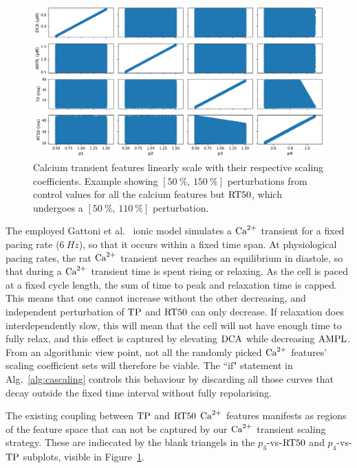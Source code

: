 \begin{figure}[!ht]
    \myfloatalign
    \includegraphics[width=\textwidth]{figures/chapter06/p_vs_b.png}
    \caption{Calcium transient features linearly scale with their respective scaling coefficients. Example showing $[\SI{50}{\percent},\,\SI{150}{\percent}]$ perturbations from control values for all the calcium features but $\textrm{RT50}$, which undergoes a $[\SI{50}{\percent},\,\SI{110}{\percent}]$ perturbation.}
    \label{fig:scalersvscafeatures}
\end{figure}

\vspace{0.2cm}
The employed Gattoni et al.~\cite{Gattoni:2017} ionic model simulates a $\textrm{Ca}^{2+}$ transient for a fixed pacing rate ($\SI{6}{Hz}$), so that it occurs within a fixed time span. At physiological pacing rates, the rat $\textrm{Ca}^{2+}$ transient never reaches an equilibrium in diastole, so that during a $\textrm{Ca}^{2+}$ transient time is spent rising or relaxing. As the cell is paced at a fixed cycle length, the sum of time to peak and relaxation time is capped. This means that one cannot increase without the other decreasing, and independent perturbation of $\textrm{TP}$ and $\textrm{RT50}$ can only decrease. If relaxation does interdependently slow, this will mean that the cell will not have enough time to fully relax, and this effect is captured by elevating $\textrm{DCA}$ while decreasing $\textrm{AMPL}$. From an algorithmic view point, not all the randomly picked $\textrm{Ca}^{2+}$ features' scaling coefficient sets will therefore be viable. The ``if" statement in Alg.~\ref{alg:cascaling} controls this behaviour by discarding all those curves that decay outside the fixed time interval without fully repolarising.

\vspace{0.2cm}
The existing coupling between $\textrm{TP}$ and $\textrm{RT50}$ $\textrm{Ca}^{2+}$ features manifests as regions of the feature space that can not be captured by our $\textrm{Ca}^{2+}$ transient scaling strategy. These are indiecated by the blank triangels in the $p_3$-vs-$\textrm{RT50}$ and $p_4$-vs-$\textrm{TP}$ subplots, visible in Figure~\ref{fig:scalersvscafeatures}.


